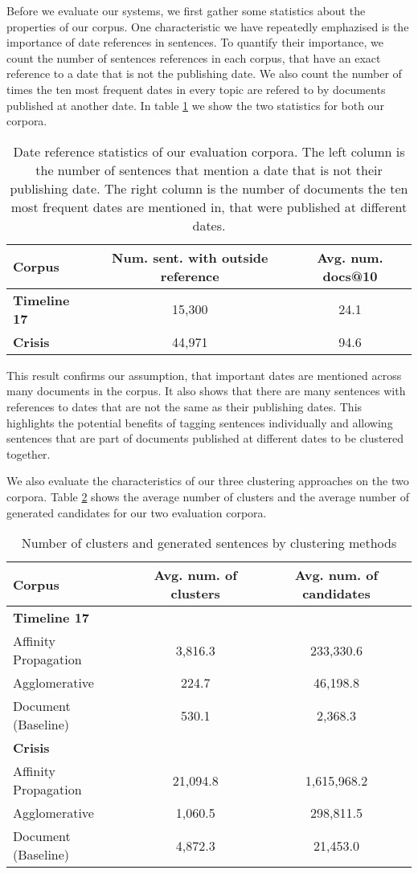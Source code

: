\documentclass[a4paper,BCOR=10mm]{report}
\numberwithin{lemma}{chapter}
\numberwithin{definition}{chapter}
\begin{document}
Before we evaluate our systems, we first gather some statistics about the properties of our corpus.
One characteristic we have repeatedly emphazised is the importance of date references in sentences.
To quantify their importance, we count the number of sentences references in each corpus, that have an exact reference to a date that is not the publishing date.
We also count the number of times the ten most frequent dates in every topic are refered to by documents published at another date.
In table \ref{tab:datestats} we show the two statistics for both our corpora.

\begin{table}
\begin{tabular}{|l|cc|}
\hline
Corpus & Num. sent. with outside reference & Avg. num. docs@10 \\\hline
\textbf{Timeline 17} & 15,300 & 24.1 \\
\textbf{Crisis} & 44,971 & 94.6 \\\hline
\end{tabular}
\caption{Date reference statistics of our evaluation corpora. The left column is the number of sentences that mention a date that is not their publishing date. The right column is the number of documents the ten most frequent dates are mentioned in, that were published at different dates.}
\label{tab:datestats}
\end{table}

This result confirms our assumption, that important dates are mentioned across many documents in the corpus. It also shows that there are many sentences with references to dates that are not the same as their publishing dates. This highlights the potential benefits of tagging sentences individually and allowing sentences that are part of documents published at different dates to be clustered together.

We also evaluate the characteristics of our three clustering approaches on the two corpora.
Table \ref{tab:genstats} shows the average number of clusters and the average number of generated candidates for our two evaluation corpora.

\begin{table}
\begin{tabular}{|l|cc|}
\hline
Corpus & Avg. num. of clusters & Avg. num. of candidates \\\hline
\multicolumn{3}{|l|}{\textbf{Timeline 17}}\\\hline
Affinity Propagation & 3,816.3 & 233,330.6 \\
Agglomerative  & 224.7 & 46,198.8 \\
Document (Baseline) & 530.1 & 2,368.3 \\\hline
\multicolumn{3}{|l|}{\textbf{Crisis}}\\\hline
Affinity Propagation & 21,094.8 & 1,615,968.2 \\
Agglomerative & 1,060.5 & 298,811.5 \\
Document (Baseline) & 4,872.3 & 21,453.0 \\\hline
\end{tabular}
\caption{Number of clusters and generated sentences by clustering methods}
\label{tab:genstats}
\end{table}
\end{document}

